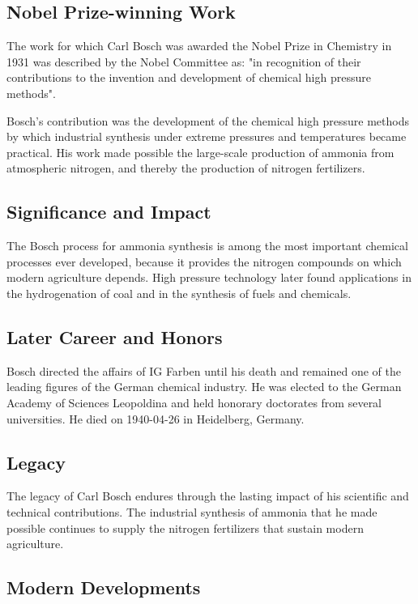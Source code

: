 \subsection*{Nobel Prize-winning Work}

The work for which Carl Bosch was awarded the Nobel Prize in Chemistry in 1931 was described by the Nobel Committee as: "in recognition of their contributions to the invention and development of chemical high pressure methods".

Bosch's contribution was the development of the chemical high pressure methods by which industrial synthesis under extreme pressures and temperatures became practical.
His work made possible the large-scale production of ammonia from atmospheric nitrogen, and thereby the production of nitrogen fertilizers.

\subsection*{Significance and Impact}

The Bosch process for ammonia synthesis is among the most important chemical processes ever developed, because it provides the nitrogen compounds on which modern agriculture depends.
High pressure technology later found applications in the hydrogenation of coal and in the synthesis of fuels and chemicals.

\subsection*{Later Career and Honors}

Bosch directed the affairs of IG Farben until his death and remained one of the leading figures of the German chemical industry.
He was elected to the German Academy of Sciences Leopoldina and held honorary doctorates from several universities.
He died on 1940-04-26 in Heidelberg, Germany.

\subsection*{Legacy}

The legacy of Carl Bosch endures through the lasting impact of his scientific and technical contributions.
The industrial synthesis of ammonia that he made possible continues to supply the nitrogen fertilizers that sustain modern agriculture.

\subsection*{Modern Developments}

